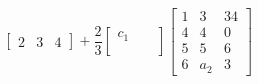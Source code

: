 \documentclass[a4paper]{article}
\begin{document}
\lecture{}{}{}	
\[
\begin{bmatrix}	2 & 3 & 4 \end{bmatrix} + \frac{2}{3} \begin{bmatrix}	c_{1} &  &  \\	 &  &  \\	 &  &  \end{bmatrix} \begin{bmatrix}	1 & 3 & 34 \\	4 & 4 & 0 \\	5 & 5 & 6 \\	6 & a_{2} & 3 \end{bmatrix}
\] 
\end{document}
